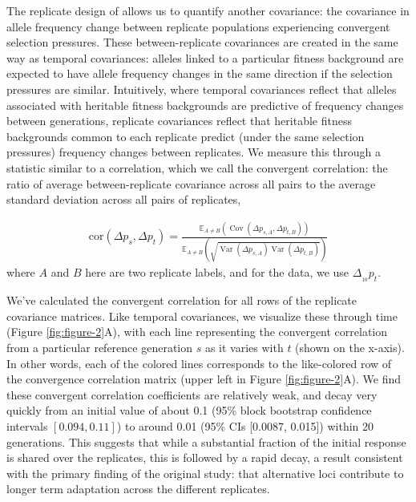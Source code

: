 \documentclass[11pt]{article}
\newcommand{\E}{\mathbb{E}}
\DeclareMathOperator{\var}{Var}
\DeclareMathOperator{\cov}{Cov}
\begin{document}
The replicate design of \textcite{Barghi2019-qy} allows us to quantify another
covariance: the covariance in allele frequency change between replicate
populations experiencing convergent selection pressures. These
between-replicate covariances are created in the same way as temporal
covariances: alleles linked to a particular fitness background are
expected to have allele frequency changes in the same direction if the
selection pressures are similar. Intuitively, where temporal covariances
reflect that alleles associated with heritable fitness backgrounds are
predictive of frequency changes between generations, replicate covariances
reflect that heritable fitness backgrounds common to each replicate predict
(under the same selection pressures) frequency changes between replicates. We
measure this through a statistic similar to a correlation, which we call the
convergent correlation: the ratio of average between-replicate covariance
across all pairs to the average standard deviation across all pairs of
replicates, 


\begin{align}
  \label{eq:conv-corr}
  \mathrm{cor}(\Delta p_s, \Delta p_t) = \frac{\E_{A\ne B} \left( \cov(\Delta p_{s,A}, \Delta p_{t,B}) \right)}{\E_{A\ne B} \left( \sqrt{\var(\Delta p_{s,A}) \var(\Delta p_{t,B})} \right)}
\end{align}
%
where $A$ and $B$ here are two replicate labels, and for the
\textcite{Barghi2019-qy} data, we use $\Delta_{_{10}} p_t$. 

We've calculated the convergent correlation for all rows of the replicate
covariance matrices. Like temporal covariances, we visualize these through time
(Figure \ref{fig:figure-2}A), with each line representing the convergent
correlation from a particular reference generation $s$ as it varies with $t$
(shown on the x-axis). In other words, each of the colored lines corresponds to
the like-colored row of the convergence correlation matrix (upper left in
Figure \ref{fig:figure-2}A). We find these convergent correlation coefficients
are relatively weak, and decay very quickly from an initial value of about 0.1
(95\% block bootstrap confidence intervals $[0.094, 0.11]$) to around 0.01
(95\% CIs [0.0087, 0.015]) within 20 generations. This suggests that while a
substantial fraction of the initial response is shared over the replicates,
this is followed by a rapid decay, a result consistent with the primary finding
of the original \textcite{Barghi2019-qy} study: that alternative loci
contribute to longer term adaptation across the different replicates. 
\end{document}
